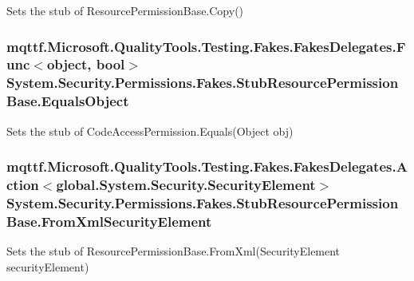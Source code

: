 Sets the stub of Resource\-Permission\-Base.\-Copy()

\hypertarget{class_system_1_1_security_1_1_permissions_1_1_fakes_1_1_stub_resource_permission_base_aaeffe4019e1e00b7b9c82cbb6f0e50d9}{
\subsubsection[{Equals\-Object}]{\setlength{\rightskip}{0pt plus 5cm}mqttf.\-Microsoft.\-Quality\-Tools.\-Testing.\-Fakes.\-Fakes\-Delegates.\-Func$<$object, bool$>$ System.\-Security.\-Permissions.\-Fakes.\-Stub\-Resource\-Permission\-Base.\-Equals\-Object}}\label{class_system_1_1_security_1_1_permissions_1_1_fakes_1_1_stub_resource_permission_base_aaeffe4019e1e00b7b9c82cbb6f0e50d9}


Sets the stub of Code\-Access\-Permission.\-Equals(\-Object obj)

\hypertarget{class_system_1_1_security_1_1_permissions_1_1_fakes_1_1_stub_resource_permission_base_a73730a978239e4e44e06ae1f207df0fc}{
\subsubsection[{From\-Xml\-Security\-Element}]{\setlength{\rightskip}{0pt plus 5cm}mqttf.\-Microsoft.\-Quality\-Tools.\-Testing.\-Fakes.\-Fakes\-Delegates.\-Action$<$global.\-System.\-Security.\-Security\-Element$>$ System.\-Security.\-Permissions.\-Fakes.\-Stub\-Resource\-Permission\-Base.\-From\-Xml\-Security\-Element}}\label{class_system_1_1_security_1_1_permissions_1_1_fakes_1_1_stub_resource_permission_base_a73730a978239e4e44e06ae1f207df0fc}


Sets the stub of Resource\-Permission\-Base.\-From\-Xml(\-Security\-Element security\-Element)

